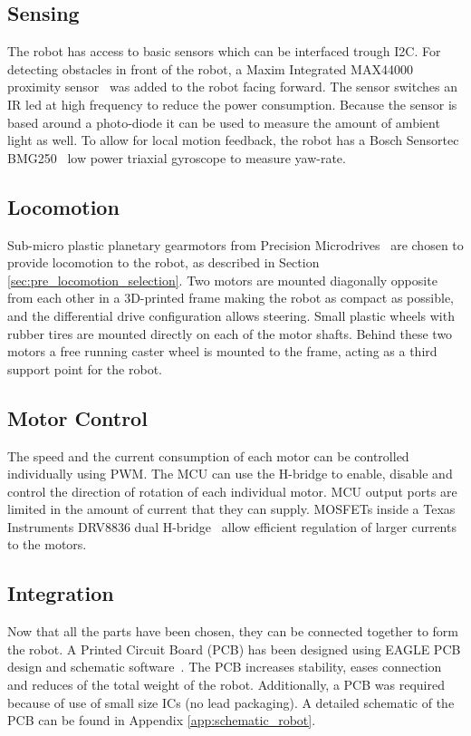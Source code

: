 \subsection{Sensing}
\label{sec:dai_sensing}

The robot has access to basic sensors which can be interfaced trough I2C.
For detecting obstacles in front of the robot, a Maxim Integrated MAX44000 proximity sensor~\cite{max44000_2017} was added to the robot facing forward.
The sensor switches an IR led at high frequency to reduce the power consumption.
Because the sensor is based around a photo-diode it can be used to measure the amount of ambient light as well.
To allow for local motion feedback, the robot has a Bosch Sensortec BMG250~\cite{bosch_bmg250_2017} low power triaxial gyroscope to measure yaw-rate.

\subsection{Locomotion}

Sub-micro plastic planetary gearmotors from Precision Microdrives~\cite{gearmotor_206-110_2017} are chosen to provide locomotion to the robot, as described in Section \ref{sec:pre_locomotion_selection}.
Two motors are mounted diagonally opposite from each other in a 3D-printed frame making the robot as compact as possible, and the differential drive configuration allows steering.
Small plastic wheels with rubber tires are mounted directly on each of the motor shafts.
Behind these two motors a free running caster wheel is mounted to the frame, acting as a third support point for the robot.

\subsection{Motor Control}
\label{sec:dai_motor_control}

The speed and the current consumption of each motor can be controlled individually using PWM.
The MCU can use the H-bridge to enable, disable and control the direction of rotation of each individual motor.
MCU output ports are limited in the amount of current that they can supply.
MOSFETs inside a Texas Instruments DRV8836 dual H-bridge~\cite{drv8836_2017} allow efficient regulation of larger currents to the motors.

\subsection{Integration}
Now that all the parts have been chosen, they can be connected together to form the robot.
A Printed Circuit Board (PCB) has been designed using EAGLE PCB design and schematic software~\cite{eagle_pcb_2017}.
The PCB increases stability, eases connection and reduces of the total weight of the robot.
Additionally, a PCB was required because of use of small size ICs (no lead packaging).
A detailed schematic of the PCB can be found in Appendix \ref{app:schematic_robot}.

